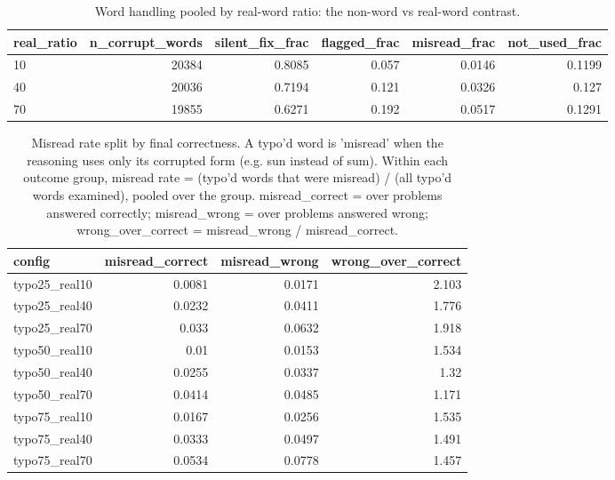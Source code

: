 \documentclass[11pt]{article}
\begin{document}
\begin{table}[H]
\centering
\caption{Word handling pooled by real-word ratio: the non-word vs real-word contrast.}
\small
\begin{adjustbox}{max width=\textwidth}
\begin{tabular}{lrrrrr}
\toprule
\textbf{real\_ratio} & \textbf{n\_corrupt\_words} & \textbf{silent\_fix\_frac} & \textbf{flagged\_frac} & \textbf{misread\_frac} & \textbf{not\_used\_frac} \\
\midrule
10 & 20384 & 0.8085 & 0.057 & 0.0146 & 0.1199 \\
40 & 20036 & 0.7194 & 0.121 & 0.0326 & 0.127 \\
70 & 19855 & 0.6271 & 0.192 & 0.0517 & 0.1291 \\
\bottomrule
\end{tabular}
\end{adjustbox}
\end{table}

\begin{table}[H]
\centering
\caption{Misread rate split by final correctness. A typo'd word is 'misread' when the reasoning uses only its corrupted form (e.g. sun instead of sum). Within each outcome group, misread rate = (typo'd words that were misread) / (all typo'd words examined), pooled over the group. misread\_correct = over problems answered correctly; misread\_wrong = over problems answered wrong; wrong\_over\_correct = misread\_wrong / misread\_correct.}
\small
\begin{adjustbox}{max width=\textwidth}
\begin{tabular}{lrrr}
\toprule
\textbf{config} & \textbf{misread\_correct} & \textbf{misread\_wrong} & \textbf{wrong\_over\_correct} \\
\midrule
typo25\_real10 & 0.0081 & 0.0171 & 2.103 \\
typo25\_real40 & 0.0232 & 0.0411 & 1.776 \\
typo25\_real70 & 0.033 & 0.0632 & 1.918 \\
typo50\_real10 & 0.01 & 0.0153 & 1.534 \\
typo50\_real40 & 0.0255 & 0.0337 & 1.32 \\
typo50\_real70 & 0.0414 & 0.0485 & 1.171 \\
typo75\_real10 & 0.0167 & 0.0256 & 1.535 \\
typo75\_real40 & 0.0333 & 0.0497 & 1.491 \\
typo75\_real70 & 0.0534 & 0.0778 & 1.457 \\
\bottomrule
\end{tabular}
\end{adjustbox}
\end{table}
\end{document}
